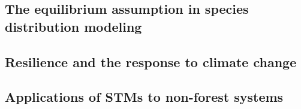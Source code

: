 \documentclass[11pt]{article}
\begin{document}
\subsection*{The equilibrium assumption in species distribution modeling}

\subsection*{Resilience and the response to climate change}

\subsection*{Applications of STMs to non-forest systems}

%
%
%
%
\end{document}
